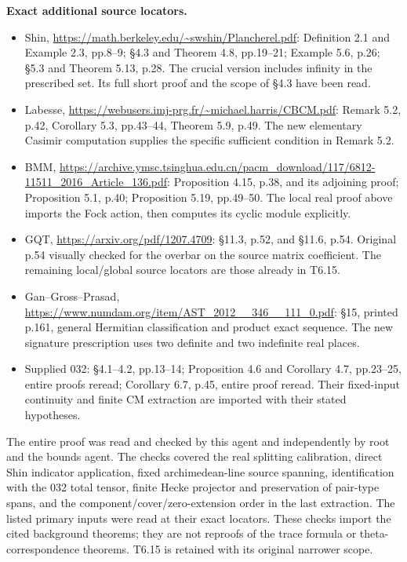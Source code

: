 \documentclass[11pt,a4paper]{article}
\providecommand{\tightlist}{\setlength{\itemsep}{0pt}\setlength{\parskip}{0pt}}
\theoremstyle{definition}
\begin{document}
\textbf{Exact additional source locators.}

\begin{itemize}
\tightlist
\item
  Shin, \url{https://math.berkeley.edu/~swshin/Plancherel.pdf}: Definition 2.1 and Example 2.3, pp.8--9; §4.3 and Theorem 4.8, pp.19--21; Example 5.6, p.26; §5.3 and Theorem 5.13, p.28. The crucial version includes infinity in the prescribed set. Its full short proof and the scope of §4.3 have been read.
\item
  Labesse, \url{https://webusers.imj-prg.fr/~michael.harris/CBCM.pdf}: Remark 5.2, p.42, Corollary 5.3, pp.43--44, Theorem 5.9, p.49. The new elementary Casimir computation supplies the specific sufficient condition in Remark 5.2.
\item
  BMM, \url{https://archive.ymsc.tsinghua.edu.cn/pacm_download/117/6812-11511_2016_Article_136.pdf}: Proposition 4.15, p.38, and its adjoining proof; Proposition 5.1, p.40; Proposition 5.19, pp.49--50. The local real proof above imports the Fock action, then computes its cyclic module explicitly.
\item
  GQT, \url{https://arxiv.org/pdf/1207.4709}: §11.3, p.52, and §11.6, p.54. Original p.54 visually checked for the overbar on the source matrix coefficient. The remaining local/global source locators are those already in T6.15.
\item
  Gan--Gross--Prasad, \url{https://www.numdam.org/item/AST_2012__346__111_0.pdf}: §15, printed p.161, general Hermitian classification and product exact sequence. The new signature prescription uses two definite and two indefinite real places.
\item
  Supplied 032: §4.1--4.2, pp.13--14; Proposition 4.6 and Corollary 4.7, pp.23--25, entire proofs reread; Corollary 6.7, p.45, entire proof reread. Their fixed-input continuity and finite CM extraction are imported with their stated hypotheses.
\end{itemize}

The entire proof was read and checked by this agent and independently by root and the bounds agent. The checks covered the real splitting calibration, direct Shin indicator application, fixed archimedean-line source spanning, identification with the 032 total tensor, finite Hecke projector and preservation of pair-type spans, and the component/cover/zero-extension order in the last extraction. The listed primary inputs were read at their exact locators. These checks import the cited background theorems; they are not reproofs of the trace formula or theta-correspondence theorems. T6.15 is retained with its original narrower scope.
\end{document}
